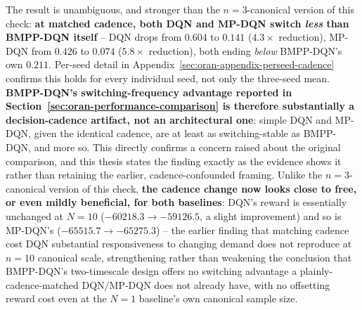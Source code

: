 \begin{table}[htbp]
\centering
\caption{DQN and MP-DQN at their own default (every-step) decision cadence
  vs.\ retrained with BMPP-DQN's $N=10$ discrete hold. The $N=1$ rows are
  the $n=10$ canonical values (Section~\ref{sec:oran-n10}); the $N=10$
  matched-cadence rows remain a 3-seed check (this control's own,
  deliberately unexpanded scope).}
\label{tab:oran-cadence-control}
\end{table}

The result is unambiguous, and stronger than the $n=3$-canonical version
of this check: \textbf{at matched cadence, both DQN and MP-DQN switch
\emph{less} than BMPP-DQN itself} -- DQN drops from $0.604$ to $0.141$
($4.3\times$ reduction), MP-DQN from $0.426$ to $0.074$ ($5.8\times$
reduction), both ending \emph{below} BMPP-DQN's own $0.211$. Per-seed
detail in Appendix~\ref{sec:oran-appendix-perseed-cadence} confirms this
holds for every individual seed, not only the three-seed mean.
\textbf{BMPP-DQN's switching-frequency advantage reported in
Section~\ref{sec:oran-performance-comparison} is therefore substantially
a decision-cadence artifact, not an architectural one}: simple DQN and
MP-DQN, given the identical cadence, are at least as switching-stable as
BMPP-DQN, and more so. This directly confirms a concern raised about the
original comparison, and this thesis states the finding exactly as the
evidence shows it rather than retaining the earlier, cadence-confounded
framing. Unlike the $n=3$-canonical version of this check, \textbf{the
cadence change now looks close to free, or even mildly beneficial, for
both baselines}: DQN's reward is essentially unchanged at $N=10$
($-60218.3 \to -59126.5$, a slight improvement) and so is MP-DQN's
($-65515.7 \to -65275.3$) -- the earlier finding that matching cadence
cost DQN substantial responsiveness to changing demand does not
reproduce at $n=10$ canonical scale, strengthening rather than weakening
the conclusion that BMPP-DQN's two-timescale design offers no switching
advantage a plainly-cadence-matched DQN/MP-DQN does not already have,
with no offsetting reward cost even at the $N=1$ baseline's own
canonical sample size.

